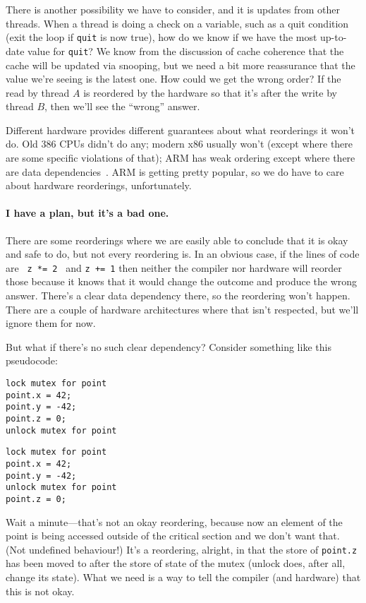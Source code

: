 There is another possibility we have to consider, and it is updates from other threads. When a thread is doing a check on a variable, such as a quit condition (exit the loop if \texttt{quit} is now true), how do we know if we have the most up-to-date value for \texttt{quit}? We know from the discussion of cache coherence that the cache will be updated via snooping, but we need a bit more reassurance that the value we're seeing is the latest one. How could we get the wrong order? If the read by thread $A$ is reordered by the hardware so that it's after the write by thread $B$, then we'll see the ``wrong'' answer. 

Different hardware provides different guarantees about what reorderings it won't do. Old 386 CPUs didn't do any; modern x86 usually won't (except where there are some specific violations of that); ARM has weak ordering except where there are data dependencies~\cite{weakvsstrong}. ARM is getting pretty popular, so we do have to care about hardware reorderings, unfortunately.

\paragraph{I have a plan, but it's a bad one.}

There are some reorderings where we are easily able to conclude that it is okay and safe to do, but not every reordering is. In an obvious case, if the lines of code are \texttt{ z *= 2 } and \texttt {z += 1} then neither the compiler nor hardware will reorder those because it knows that it would change the outcome and produce the wrong answer. There's a clear data dependency there, so the reordering won't happen. There are a couple of hardware architectures where that isn't respected, but we'll ignore them for now.

\newpage
But what if there's no such clear dependency? Consider something like this pseudocode:

\begin{multicols}{2}
\begin{verbatim}
lock mutex for point
point.x = 42;
point.y = -42;
point.z = 0;
unlock mutex for point
\end{verbatim}
\columnbreak
\begin{verbatim}
lock mutex for point
point.x = 42;
point.y = -42;
unlock mutex for point
point.z = 0;
\end{verbatim}
\end{multicols}

Wait a minute---that's not an okay reordering, because now an element of the point is being accessed outside of the critical section and we don't want that. (Not undefined behaviour!) It's a reordering, alright, in that the store of \texttt{point.z} has been moved to after the store of state of the mutex (unlock does, after all, change its state). What we need is a way to tell the compiler (and hardware) that this is not okay.


